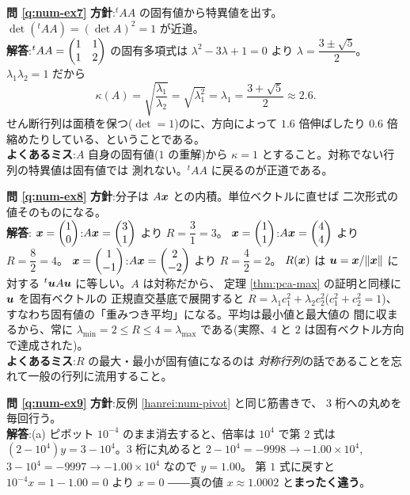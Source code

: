 \bigskip
\noindent\textbf{問 \ref{q:num-ex7}}\quad
\textbf{方針}:${}^tAA$ の固有値から特異値を出す。
$\det({}^tAA) = (\det A)^2 = 1$ が近道。\\
\textbf{解答}:${}^tAA = \begin{pmatrix}1 & 1 \\ 1 & 2\end{pmatrix}$ の固有多項式は
$\lambda^2 - 3\lambda + 1 = 0$ より
$\lambda = \dfrac{3 \pm \sqrt{5}}{2}$。
$\lambda_1\lambda_2 = 1$ だから
\[
\kappa(A) = \sqrt{\frac{\lambda_1}{\lambda_2}}
= \sqrt{\lambda_1^2} = \lambda_1 = \frac{3 + \sqrt{5}}{2}
\approx 2.6.
\]
せん断行列は面積を保つ($\det = 1$)のに、方向によって
$1.6$ 倍伸ばしたり $0.6$ 倍縮めたりしている、ということである。\\
\textbf{よくあるミス}:$A$ 自身の固有値($1$ の重解)から
$\kappa = 1$ とすること。対称でない行列の特異値は固有値では
測れない。${}^tAA$ に戻るのが正道である。

\bigskip
\noindent\textbf{問 \ref{q:num-ex8}}\quad
\textbf{方針}:分子は $A\bm{x}$ との内積。単位ベクトルに直せば
二次形式の値そのものになる。\\
\textbf{解答}:
$\bm{x} = \begin{pmatrix}1 \\ 0\end{pmatrix}$:$A\bm{x} = \begin{pmatrix}3 \\ 1\end{pmatrix}$ より
$R = \dfrac{3}{1} = 3$。
$\bm{x} = \begin{pmatrix}1 \\ 1\end{pmatrix}$:$A\bm{x} = \begin{pmatrix}4 \\ 4\end{pmatrix}$ より
$R = \dfrac{8}{2} = 4$。
$\bm{x} = \begin{pmatrix}1 \\ -1\end{pmatrix}$:$A\bm{x} = \begin{pmatrix}2 \\ -2\end{pmatrix}$ より
$R = \dfrac{4}{2} = 2$。
$R(\bm{x})$ は $\bm{u} = \bm{x}/\|\bm{x}\|$ に対する
${}^t\bm{u}A\bm{u}$ に等しい。$A$ は対称だから、
定理 \ref{thm:pca-max} の証明と同様に $\bm{u}$ を固有ベクトルの
正規直交基底で展開すると
$R = \lambda_1 c_1^2 + \lambda_2 c_2^2$($c_1^2 + c_2^2 = 1$)、
すなわち固有値の「重みつき平均」になる。平均は最小値と最大値の
間に収まるから、常に $\lambda_{\min} = 2 \le R \le 4 = \lambda_{\max}$
である(実際、$4$ と $2$ は固有ベクトル方向で達成された)。\\
\textbf{よくあるミス}:$R$ の最大・最小が固有値になるのは
\emph{対称行列}の話であることを忘れて一般の行列に流用すること。

\bigskip
\noindent\textbf{問 \ref{q:num-ex9}}\quad
\textbf{方針}:反例 \ref{hanrei:num-pivot} と同じ筋書きで、
$3$ 桁への丸めを毎回行う。\\
\textbf{解答}:(a) ピボット $10^{-4}$ のまま消去すると、倍率は
$10^4$ で第 $2$ 式は $(2 - 10^4)y = 3 - 10^4$。$3$ 桁に丸めると
$2 - 10^4 = -9998 \to -1.00 \times 10^4$,
$3 - 10^4 = -9997 \to -1.00 \times 10^4$ なので $y = 1.00$。
第 $1$ 式に戻すと $10^{-4}x = 1 - 1.00 = 0$ より $x = 0$
――真の値 $x \approx 1.0002$ と\textbf{まったく違う}。


